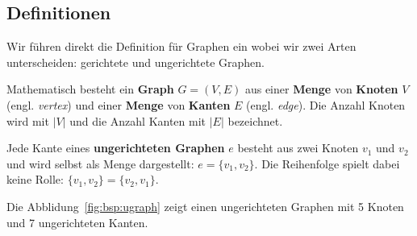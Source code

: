 \subsection{Definitionen}

Wir führen direkt die Definition für Graphen ein wobei wir zwei Arten unterscheiden: gerichtete und ungerichtete Graphen.

\begin{mdef}
Mathematisch besteht ein \textbf{Graph} $G=(V,E)$ aus einer \textbf{Menge} von \textbf{Knoten} $V$ (engl. \emph{vertex}) und einer \textbf{Menge} von \textbf{Kanten} $E$ (engl. \emph{edge}).
Die Anzahl Knoten wird mit $|V|$ und die Anzahl Kanten mit $|E|$ bezeichnet.
\end{mdef}



\begin{mdef}
Jede Kante eines \textbf{ungerichteten Graphen} $e$ besteht aus zwei Knoten $v_1$ und $v_2$ und wird selbst als Menge dargestellt: $e= \{v_1,v_2\}$.
Die Reihenfolge spielt dabei keine Rolle: $\{v_1,v_2\} = \{v_2,v_1\}$.
\end{mdef}


\begin{mbsp}
Die Abblidung~\ref{fig:bsp:ugraph} zeigt einen ungerichteten Graphen mit 5 Knoten und 7 ungerichteten Kanten.
\end{mbsp}

